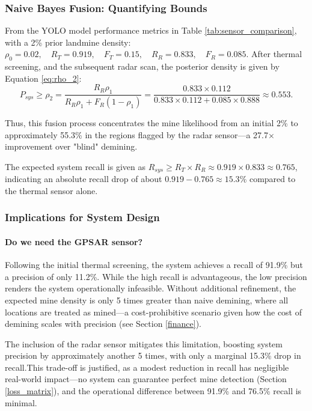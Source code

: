     \subsubsection{Naive Bayes Fusion: Quantifying Bounds}
    
        From the YOLO model performance metrics in Table \ref{tab:sensor_comparison}, with a 2\% prior landmine density: $\rho_0 = 0.02,\quad R_T = 0.919,\quad F_T = 0.15,\quad R_R = 0.833,\quad F_R = 0.085.$ After thermal screening, and the subsequent radar scan, the posterior density is given by Equation \ref{eq:rho_2}:
        \[
        P_{sys} \geq \rho_2 = \frac{R_R \rho_1}{R_R \rho_1 + F_R (1-\rho_1)} = \frac{0.833 \times 0.112}{0.833 \times 0.112 + 0.085 \times 0.888} \approx 0.553.
        \]
        
        Thus, this fusion process concentrates the mine likelihood from an initial 2\% to approximately 55.3\% in the regions flagged by the radar sensor—a  27.7× improvement over "blind" demining.
        
        The expected system recall is given as $R_{sys} \geq R_T \times R_R \approx 0.919 \times 0.833 \approx 0.765$, indicating an absolute recall drop of about $0.919 - 0.765 \approx 15.3\%$ compared to the thermal sensor alone.


    \subsubsection{Implications for System Design}

        \paragraph{Do we need the GPSAR sensor?}
        
            Following the initial thermal screening, the system achieves a recall of 91.9\% but a precision of only 11.2\%. While the high recall is advantageous, the low precision renders the system operationally infeasible. Without additional refinement, the expected mine density is only 5 times greater than naive demining, where all locations are treated as mined—a cost-prohibitive scenario given how the cost of demining scales with precision (see Section \ref{finance}). 
        
            The inclusion of the radar sensor mitigates this limitation, boosting system precision by approximately another 5 times, with only a marginal 15.3\% drop in recall.This trade-off is justified, as a modest reduction in recall has negligible real-world impact—no system can guarantee perfect mine detection (Section \ref{loss_matrix}), and the operational difference between 91.9\% and 76.5\% recall is minimal.
        
